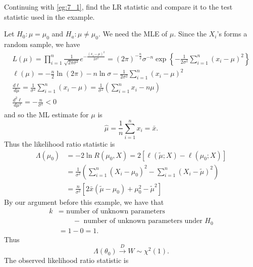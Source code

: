 \documentclass[notoc,notitlepage]{tufte-book}
\newcommand{\convd}{\overset{D}{\to}}
\begin{document}
\begin{eg}
  Continuing with \cref{eg:7_1}, find the LR statistic and compare it to the test statistic used in the example.
\end{eg}

\begin{solution}
  Let $H_0 : \mu = \mu_0$ and $H_a : \mu \neq \mu_0$. We need the MLE of $\mu$. Since the $X_i$'s forms a random sample, we have
  \begin{gather*}
    L(\mu) = \prod_{i=1}^{n} \frac{1}{\sqrt{2 \pi \sigma^2}} e^{-\frac{(x_i - \mu)^2}{2 \sigma^2}} = (2 \pi)^{-\frac{n}{2}} \sigma^{-n} \exp\left\{ - \frac{1}{2 \sigma^2} \sum_{i=1}^{n} (x_i - \mu)^2 \right\} \\
    \ell(\mu) = - \frac{n}{2} \ln (2 \pi) - n \ln \sigma - \frac{1}{2 \sigma^2} \sum_{i=1}^{n} (x_i - \mu)^2 \\
    \frac{d \ell}{d \mu} = \frac{1}{\sigma^2} \sum_{i=1}^{n} (x_i - \mu) = \frac{1}{\sigma^2} ( \sum_{i=1}^{n} x_i - n \mu ) \\
    \frac{d^2 \ell}{d \mu^2} = - \frac{n}{\sigma^2} < 0
  \end{gather*}
  and so the ML estimate for $\mu$ is
  \begin{equation*}
    \hat{\mu} = \frac{1}{n} \sum_{i=1}^{n} x_i = \bar{x}.
  \end{equation*}
  Thus the likelihood ratio statistic is
  \begin{align*}
    \Lambda(\mu_0) &= -2 \ln R(\mu_0, X) = 2 [ \ell(\tilde{\mu}; X) - \ell(\mu_0; X) ] \\
                   &= \frac{1}{\sigma^2} \left( \sum_{i=1}^{n} (X_i - \mu_0)^2 - \sum_{i=1}^{n} (X_i - \tilde{\mu})^2 \right) \\
                   &= \frac{n}{\sigma^2} \left[ 2\bar{x}(\tilde{\mu} - \mu_0) + \mu_0^2 - \tilde{\mu}^2 \right]
  \end{align*}
  By our argument before this example, we have that
  \begin{align*}
    k &= \text{ number of unknown parameters } \\
      &\qquad- \text{ number of unknown parameters under } H_0 \\
      &= 1 - 0 = 1.
  \end{align*}
  Thus
  \begin{equation*}
    \Lambda(\theta_0) \convd W \sim \chi^2(1).
  \end{equation*}
  The observed likelihood ratio statistic is
  \begin{align*}

\end{align*}
\end{solution}
\end{document}
